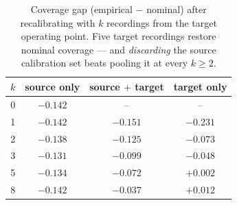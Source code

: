 \begin{table}[t]
\centering\footnotesize\setlength{\tabcolsep}{5pt}
\caption{Coverage gap (empirical $-$ nominal) after recalibrating with $k$
recordings from the target operating point. Five target recordings restore
nominal coverage --- and \emph{discarding} the source calibration set beats
pooling it at every $k \geq 2$.}
\label{tab:recal}
\begin{tabular}{cccc}
\toprule
$k$ & source only & source $+$ target & target only \\
\midrule
0 & $-0.142$ & -- & -- \\
1 & $-0.142$ & $-0.151$ & $-0.231$ \\
2 & $-0.138$ & $-0.125$ & $-0.073$ \\
3 & $-0.131$ & $-0.099$ & $-0.048$ \\
5 & $-0.134$ & $-0.072$ & \textbf{$+0.002$} \\
8 & $-0.142$ & $-0.037$ & \textbf{$+0.012$} \\
\bottomrule
\end{tabular}
\end{table}
